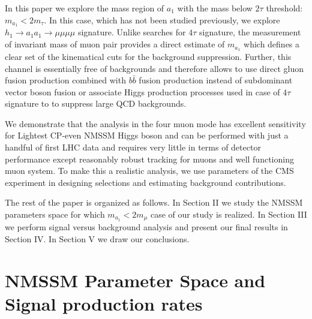 \documentclass[aps,12pt,superscriptaddress,nofootinbib,floatfix,showpacs]{revtex4}
\begin{document}
In this paper we explore the  mass region of  $a_1$ 
with the mass below $2\tau$ threshold: $m_{a_1}<2m_\tau$.
In this case, which has not been studied previously, we 
explore $h_1 \to a_1a_1 \to \mu \mu \mu \mu$ signature.
Unlike searches for $4\tau$ signature,
the measurement of invariant mass of muon pair provides a 
direct estimate of $m_{a_1}$ which defines a clear set of the kinematical
cuts for the background suppression. 
Further, this
channel is essentially free of backgrounds and therefore allows to use
direct gluon fusion production combined with  $b\bar{b}$ fusion production
instead of subdominant  vector boson fusion or associate 
Higgs production processes used in case of $4\tau$ signature to to suppress large QCD
backgrounds.

We demonstrate that the analysis in
the four muon mode has excellent sensitivity for Lightest CP-even NMSSM Higgs boson
and can be performed with just  a handful of first LHC data and requires 
very little in terms of detector performance  except reasonably robust tracking 
for muons and well functioning muon system. To make 
this a realistic analysis, we use parameters of the CMS experiment in designing
selections and estimating background contributions.

The rest of the paper is organized as follows.
In Section II we study the NMSSM parameters space 
for which $m_{a_1}<2m_\mu$ case of our study is realized.
In Section III we perform signal versus background analysis
and present our final  results in Section IV.
In Section V we draw our conclusions.



\section{NMSSM Parameter Space and Signal production rates}
\end{document}
